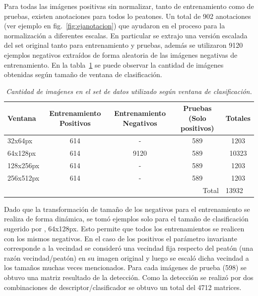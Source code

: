 Para todas las imágenes positivas sin normalizar, tanto de entrenamiento como de pruebas, existen anotaciones para todos lo peatones. Un total de 902 anotaciones (ver ejemplo en fig.~\ref{fig:ejanotacion}) que ayudaron en el proceso para la normalización a diferentes escalas. En particular se extrajo una versión escalada del set original tanto para entrenamiento y pruebas, además se utilizaron 9120 ejemplos negativos extraídos de forma aleatoria de las imágenes negativas de entrenamiento. En la tabla~\ref{tab:useddataset} se puede observar la cantidad de imágenes obtenidas según tamaño de ventana de clasificación.

\begin{table}[h]
\caption{\em Cantidad de imaǵenes en el set de datos utilizado según ventana de clasificación.}  
  \label{tab:useddataset}
  \resizebox{15cm}{!} {
\begin{tabular}{lcc|c|c|}
\hline
\multicolumn{1}{|l|}{Ventana}   & \multicolumn{1}{c|}{Entrenamiento Positivos} & Entrenamiento Negativos & Pruebas (Solo positivos)   & Totales                    \\ \hline
\multicolumn{1}{|l|}{32x64px}   & \multicolumn{1}{c|}{614}                     & -                       & 589                        & 1203                       \\ \hline
\multicolumn{1}{|l|}{64x128px}  & \multicolumn{1}{c|}{614}                     & 9120                    & 589                        & 10323                      \\ \hline
\multicolumn{1}{|l|}{128x256px} & \multicolumn{1}{c|}{614}                     & -                       & 589                        & 1203                       \\ \hline
\multicolumn{1}{|l|}{256x512px} & \multicolumn{1}{c|}{614}                     & -                       & 589                        & 1203                       \\ \hline
                                & \multicolumn{1}{l}{}                         & \multicolumn{1}{l|}{}   & \multicolumn{1}{r|}{Total} & \multicolumn{1}{l|}{13932} \\ \cline{4-5} 
\end{tabular}}
\end{table}
 
 
Dado que la transformación de tamaño de los negativos para el entrenamiento se realiza de forma dinámica, se tomó ejemplos solo para el tamaño de clasificación sugerido por \cite{dalal2006}, 64x128px. Esto permite que todos los entrenamientos se realicen con los mismos negativos. En el caso de los positivos el parámetro invariante corresponde a la vecindad \ie se consideró una vecindad fija respecto del peatón (una razón vecindad/peatón) en su imagen original y luego se escaló dicha vecindad a los tamaños muchas veces mencionados.
Para cada imágenes de prueba (598) se obtuvo una matriz resultado de la detección. Como la detección se realizó por dos combinaciones de descriptor/clasificador se obtuvo un total del 4712 matrices. 


